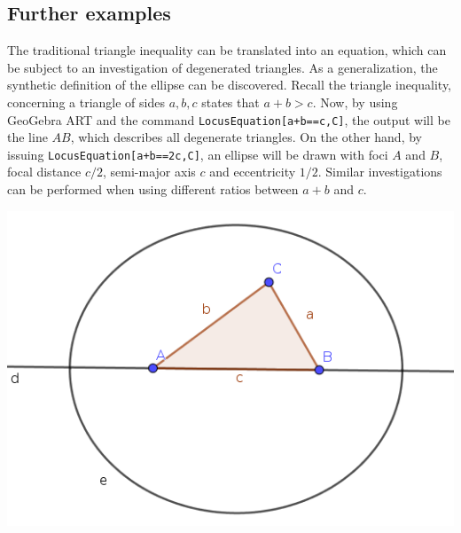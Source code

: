\documentclass{article}
\begin{document}
\subsection{Further examples}

The traditional triangle inequality can be translated into an equation, which can be subject to an investigation of degenerated triangles. As a generalization, the synthetic definition of the ellipse can be discovered.
Recall the triangle inequality, concerning a triangle of sides $a,b,c$  states that $a+b>c$. Now,  by using GeoGebra ART and the command
\texttt{LocusEquation[a+b==c,C]},  the output will be the line $AB$,  which
describes all degenerate triangles. On the other hand, by issuing \texttt{LocusEquation[a+b==2c,C]},
an ellipse will be drawn with foci $A$ and $B$, focal distance $c/2$, semi-major axis $c$
and eccentricity $1/2$. Similar investigations can be performed when using different
ratios between $a+b$ and $c$.
\begin{center}
\includegraphics[scale=0.5]{further1}
\end{center}
\end{document}
